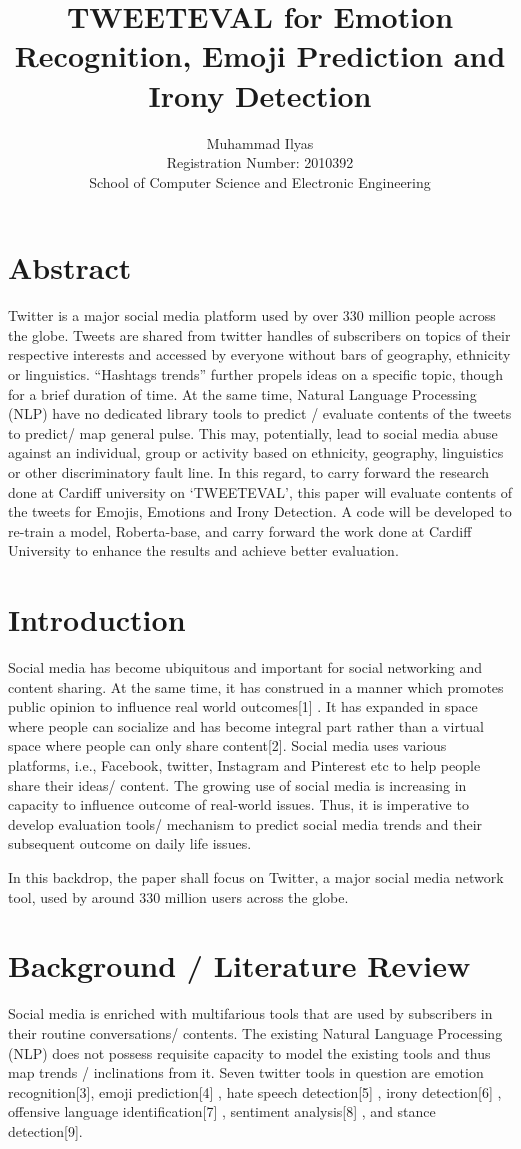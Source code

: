 \documentclass[a4paper]{article}
\title{TWEETEVAL for Emotion Recognition, Emoji Prediction and Irony  Detection}
\author{Muhammad Ilyas\\Registration Number: 2010392 \\School of Computer Science and Electronic Engineering
}
\begin{document}
\maketitle
\section{Abstract}
\quad Twitter is a major social media platform used by over 330 million people across the globe. Tweets are shared from twitter handles of subscribers on topics of their respective interests and accessed by everyone without bars of geography, ethnicity or linguistics. “Hashtags trends” further propels ideas on a specific topic, though for a brief duration of time. At the same time, Natural Language Processing (NLP) have no dedicated library tools to predict / evaluate contents of the tweets to predict/ map general pulse. This may, potentially, lead to social media abuse against an individual, group or activity based on ethnicity, geography, linguistics or other discriminatory fault line. In this regard, to carry forward the research done at Cardiff university on ‘TWEETEVAL’, this paper will evaluate contents of the tweets for Emojis, Emotions and Irony Detection. A code will be developed to re-train a model, Roberta-base, and carry forward the work done at Cardiff University to enhance the results and achieve better evaluation.  
\section{Introduction}
\quad Social media has become ubiquitous and important for social networking and content sharing. At the same time, it has construed in a manner which promotes public opinion to influence real world outcomes[1] .  It has expanded in space where people can socialize and has become integral part rather than a virtual space where people can only share content[2]. Social media uses various platforms, i.e., Facebook, twitter, Instagram and Pinterest etc to help people share their ideas/ content. The growing use of social media is increasing in capacity to influence outcome of real-world issues. Thus, it is imperative to develop evaluation tools/ mechanism to predict social media trends and their subsequent outcome on daily life issues.

In this backdrop, the paper shall focus on Twitter, a major social media network tool, used by around 330 million users across the globe. 
\section{Background / Literature Review}
\quad Social media is enriched with multifarious tools that are used by subscribers in their routine conversations/ contents. The existing Natural Language Processing (NLP) does not possess requisite capacity to model the existing tools and thus map trends / inclinations from it. Seven twitter tools in question are emotion recognition[3], emoji prediction[4] , hate speech detection[5] , irony detection[6] , offensive language identification[7] , sentiment analysis[8] , and stance detection[9]. 
\end{document}
